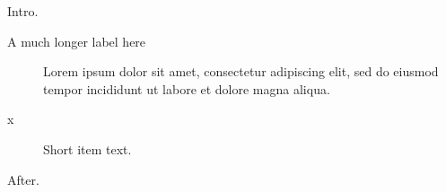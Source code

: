 \documentclass[11pt]{article}
\begin{document}
Intro.
\begin{description}
\item[A much longer label here] Lorem ipsum dolor sit amet, consectetur adipiscing elit, sed do eiusmod tempor incididunt ut labore et dolore magna aliqua.
\item[x] Short item text.
\end{description}
After.
\end{document}
